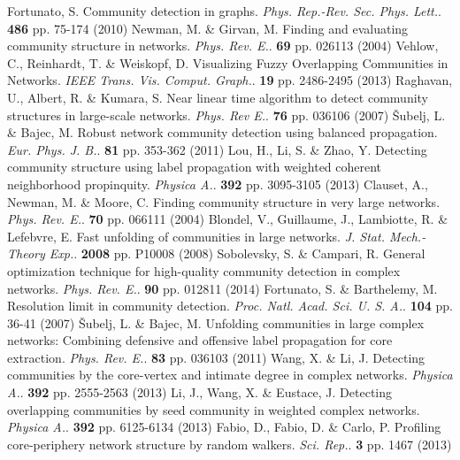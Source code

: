 \documentclass{article}
\begin{document}
\begin{thebibliography}{1}

	Fortunato, S. Community detection in graphs. {\em Phys. Rep.-Rev. Sec. Phys. Lett.}. \textbf{486} pp. 75-174 (2010)
	Newman, M. \& Girvan, M. Finding and evaluating community structure in networks. {\em Phys. Rev. E.}. \textbf{69} pp. 026113 (2004)
	Vehlow, C., Reinhardt, T. \& Weiskopf, D. Visualizing Fuzzy Overlapping Communities in Networks. {\em IEEE Trans. Vis. Comput. Graph.}. \textbf{19} pp. 2486-2495 (2013)
	Raghavan, U., Albert, R. \& Kumara, S. Near linear time algorithm to detect community structures in large-scale networks. {\em Phys. Rev E.}. \textbf{76} pp. 036106 (2007)
	Šubelj, L. \& Bajec, M. Robust network community detection using balanced propagation. {\em Eur. Phys. J. B.}. \textbf{81} pp. 353-362 (2011)
	Lou, H., Li, S. \& Zhao, Y. Detecting community structure using label propagation with weighted coherent neighborhood propinquity. {\em Physica A.}. \textbf{392} pp. 3095-3105 (2013)
	Clauset, A., Newman, M. \& Moore, C. Finding community structure in very large networks. {\em Phys. Rev. E.}. \textbf{70} pp. 066111 (2004)
	Blondel, V., Guillaume, J., Lambiotte, R. \& Lefebvre, E. Fast unfolding of communities in large networks. {\em J. Stat. Mech.-Theory Exp.}. \textbf{2008} pp. P10008 (2008)
	Sobolevsky, S. \& Campari, R. General optimization technique for high-quality community detection in complex networks. {\em Phys. Rev. E.}. \textbf{90} pp. 012811 (2014)
	Fortunato, S. \& Barthelemy, M. Resolution limit in community detection. {\em Proc. Natl. Acad. Sci. U. S. A.}. \textbf{104} pp. 36-41 (2007)
	Šubelj, L. \& Bajec, M. Unfolding communities in large complex networks: Combining defensive and offensive label propagation for core extraction. {\em Phys. Rev. E.}. \textbf{83} pp. 036103 (2011)
	Wang, X. \& Li, J. Detecting communities by the core-vertex and intimate degree in complex networks. {\em Physica A.}. \textbf{392} pp. 2555-2563 (2013)
	Li, J., Wang, X. \& Eustace, J. Detecting overlapping communities by seed community in weighted complex networks. {\em Physica A.}. \textbf{392} pp. 6125-6134 (2013)
	Fabio, D., Fabio, D. \& Carlo, P. Profiling core-periphery network structure by random walkers. {\em Sci. Rep.}. \textbf{3} pp. 1467 (2013)

\end{thebibliography}
\end{document}
